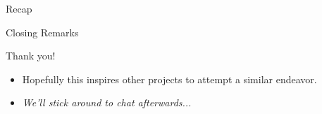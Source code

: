 \documentclass{beamer}
\begin{document}
\begin{frame}{Recap}
	\tableofcontents
\end{frame}

\begin{frame}{Closing Remarks}
	\begin{center}
		{\Huge Thank you!}

		\begin{itemize}
			\item Hopefully this inspires other projects to attempt a similar
				endeavor.
			\item \textit{We'll stick around to chat afterwards...}
		\end{itemize}
	\end{center}
\end{frame}
\end{document}
